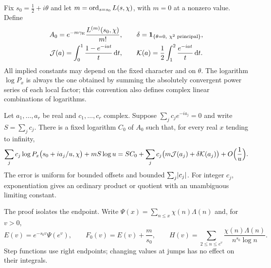 Fix $s_0=\tfrac12+i\theta$ and let $m=\operatorname{ord}_{s=s_0}L(s,\chi)$, with $m=0$ at a nonzero value.
Define
\begin{gather*}
 A_0=e^{-m\gamma_{\mathrm{E}}}\frac{L^{(m)}(s_0,\chi)}{m!},\qquad
 \delta=\mathbf 1_{\{\theta=0,\ \chi^2\text{ principal}\}},\\
 \mathcal{J}(a)=\int_0^1\frac{1-e^{-iat}}{t}\,\mathrm{d} t,\qquad
 \mathcal{K}(a)=\frac12\int_1^2\frac{e^{-iat}}{t}\,\mathrm{d} t .
\end{gather*}
All implied constants may depend on the fixed character and on $\theta$. The logarithm
$\log P_x$ is always the one obtained by summing the absolutely convergent power series of
each local factor; this convention also defines complex linear combinations of logarithms.

\begin{theorem}\label{zer:thm:pair}
Let $a_1,\dots,a_r$ be real and $c_1,\dots,c_r$ complex. Suppose
$\sum_jc_je^{-ia_j}=0$ and write $S=\sum_jc_j$. There is a fixed logarithm $C_0$ of $A_0$ such
that, for every real $x$ tending to infinity,
\begin{equation}\label{zer:eq:lin}
 \sum_jc_j\log P_x\bigl(s_0+ia_j/u,\chi\bigr)+mS\log u
 =SC_0+\sum_jc_j\bigl(m\mathcal{J}(a_j)+\delta\mathcal{K}(a_j)\bigr)+O\Bigl(\frac1u\Bigr).
\end{equation}
The error is uniform for bounded offsets and bounded $\sum_j\lvert c_j\rvert$. For integer $c_j$,
exponentiation gives an ordinary product or quotient with an unambiguous limiting constant.
\end{theorem}

The proof isolates the endpoint. Write $\Psi(x)=\sum_{n\le x}\chi(n)\Lambda(n)$ and, for $v>0$,
\[
 E(v)=e^{-s_0v}\Psi(e^v),\qquad F_0(v)=E(v)+\frac m{s_0},\qquad
 H(v)=\sum_{2\le n\le e^v}\frac{\chi(n)\Lambda(n)}{n^{s_0}\log n}.
\]
Step functions use right endpoints; changing values at jumps has no effect on their integrals.


